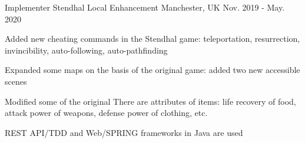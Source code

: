 \begin{cventries}
  \cventry
    {Implementer} %
    {Stendhal Local Enhancement} %
    {Manchester, UK} %
    {Nov. 2019 - May. 2020} %
    {
      \begin{cvitems} %
        \item {Added new cheating commands in the Stendhal game: teleportation, resurrection, invincibility, auto-following, auto-pathfinding}
        \item {Expanded some maps on the basis of the original game: added two new accessible scenes}
        \item {Modified some of the original There are attributes of items: life recovery of food, attack power of weapons, defense power of clothing, etc.}
        \item {REST API/TDD and Web/SPRING frameworks in Java are used}
      \end{cvitems}
    }

\end{cventries}

